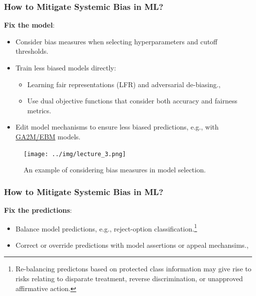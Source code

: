 \documentclass[11pt,aspectratio=169,hyperref={colorlinks}]{beamer}
\begin{document}
			
		\begin{frame}[allowframebreaks]			
		
			\frametitle{How to Mitigate Systemic Bias in ML?}			
			
			\noindent 
			\textbf{Fix the model}:
			\begin{itemize}
				\item Consider bias measures when selecting hyperparameters and cutoff thresholds.
				\item Train less biased models directly:
				\begin{itemize}
					\item Learning fair representations (LFR) and adversarial de-biasing.\cite{zemel2013learning}, \cite{zhang2018mitigating}
					\item Use dual objective functions that consider both accuracy and fairness metrics.
				\end{itemize}
				\item Edit model mechanisms to ensure less biased predictions, e.g., with \href{https://github.com/interpretml/interpret}{GA2M/EBM} models.
			\end{itemize}	
			
			\framebreak
			\centering
			\begin{figure}
			\texttt{[image: ../img/lecture\_3.png]}
			\caption{An example of considering bias measures in model selection.}
			\end{figure}
			
		\end{frame}	
		
		\begin{frame}[allowframebreaks]			
		
			\frametitle{How to Mitigate Systemic Bias in ML?}					
			
			\noindent \Large \textbf{Fix the predictions}: 
			\begin{itemize}
				\item Balance model predictions, e.g., reject-option classification.\cite{kamiran2012decision}\footnote{Re-balancing predictons based on protected class information may give rise to risks relating to disparate treatment, reverse discrimination, or unapproved affirmative action.}	
				\item Correct or override predictions with model assertions or appeal mechansims.\cite{hall2019guidelines}, \cite{kangdebugging}
			\end{itemize}
			
		\end{frame}
	
\end{document}
